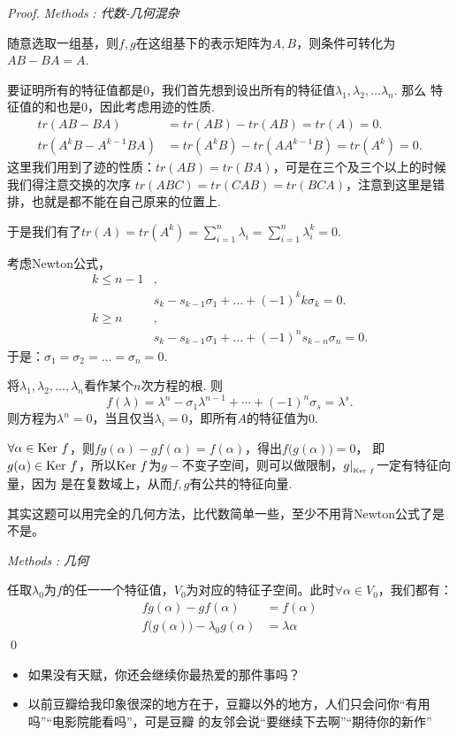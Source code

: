 \begin{proof}
	\emph{Methods\,\,\uppercase\expandafter{}: 代数-几何混杂}

	随意选取一组基，则$f,g$在这组基下的表示矩阵为$A,B$，则条件可转化为$AB-BA=A$.

	要证明所有的特征值都是0，我们首先想到设出所有的特征值$\lambda_1,\lambda_2,\dots\lambda_n$. 那么
	特征值的和也是$0$，因此考虑用迹的性质.
	\begin{align*}
		tr(AB-BA) &= tr(AB) - tr(AB) = tr(A) = 0. \\
		tr(A^kB-A^{k-1}BA) &= tr(A^kB) - tr(A A^{k-1} B) = tr(A^k) = 0.
	\end{align*}
	这里我们用到了迹的性质：$tr(AB) = tr(BA)$，可是在三个及三个以上的时候我们得注意交换的次序
	$tr(ABC) = tr(CAB) = tr(BCA)$，注意到这里是错排，也就是都不能在自己原来的位置上.

	于是我们有了$tr(A)=tr(A^k)=\sum_{i=1}^n \lambda_i = \sum_{i=1}^n \lambda_i^k=0$.

	考虑Newton公式，
	\begin{align*}
		k \leq n-1&,\\
		& s_k - s_{k-1} \sigma_1 + \dots + (-1)^k k\sigma_k = 0. \\
		k \geq n \quad\,\,\,\, &,\\
		& s_k - s_{k-1} \sigma_1 + \dots + (-1)^n s_{k-n} \sigma_n = 0.
	\end{align*}
	于是：$\sigma_1=\sigma_2=\dots=\sigma_n=0$.
	
	将$\lambda_1,\lambda_2,\dots,\lambda_n$看作某个$n$次方程的根. 则
	$$
		f(\lambda) = \lambda^n - \sigma_1 \lambda^{n-1} + \cdots + (-1)^{n}\sigma_s = \lambda^s.
	$$
	则方程为$\lambda^n=0$，当且仅当$\lambda_i=0$，即所有$A$的特征值为$0$.

	$\forall \alpha \in \text{Ker}\, \, f$，则$fg(\alpha) - gf(\alpha) = f (\alpha)$，得出$f\bigl( g(\alpha) \bigr) = 0$，
	即$g(\alpha) \in \text{Ker}\, \, f$，所以$\text{Ker}\, \, f$为$g-$不变子空间，则可以做限制，$g |_{_{\text{Ker}\,\,f}}$一定有特征向量，因为
	是在复数域上，从而$f,g$有公共的特征向量. 

	其实这题可以用完全的几何方法，比代数简单一些，至少不用背Newton公式了是不是。

	\emph{Methods\,\,\uppercase\expandafter{}: 几何}

	任取$\lambda_0$为$f$的任一一个特征值，$V_0$为对应的特征子空间。此时$\forall \alpha \in 
	V_0$，我们都有：
	\begin{align*}
		fg (\alpha) - gf (\alpha) &= f(\alpha) \\
		f \bigl( g(\alpha) \bigr) - \lambda_0 g(\alpha) &= \lambda \alpha
	\end{align*}
	\qed{}
\end{proof}

\begin{itemize}
	\item 如果没有天赋，你还会继续你最热爱的那件事吗？
	\item 以前豆瓣给我印象很深的地方在于，豆瓣以外的地方，人们只会问你“有用吗”“电影院能看吗”，可是豆瓣
		  的友邻会说“要继续下去啊”“期待你的新作”
\end{itemize}
